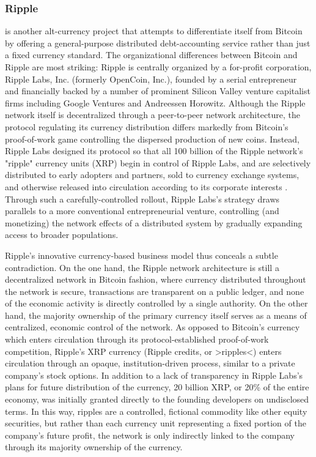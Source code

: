 \subsubsection*{Ripple}
 is another alt-currency project that attempts to differentiate itself from Bitcoin by offering a general-purpose distributed debt-accounting service rather than just a fixed currency standard. The organizational differences between Bitcoin and Ripple are most striking: Ripple is centrally organized by a for-profit corporation, Ripple Labs, Inc. (formerly OpenCoin, Inc.), founded by a serial entrepreneur and financially backed by a number of prominent Silicon Valley venture capitalist firms including Google Ventures and Andreessen Horowitz. Although the Ripple network itself is decentralized through a peer-to-peer network architecture, the protocol regulating its currency distribution differs markedly from Bitcoin's proof-of-work game controlling the dispersed production of new coins. Instead, Ripple Labs designed its protocol so that all 100 billion of the Ripple network's "ripple" currency units (XRP) begin in control of Ripple Labs, and are selectively distributed to early adopters and partners, sold to currency exchange systems, and otherwise released into circulation according to its corporate interests \autocite*{RippleDistribution}. Through such a carefully-controlled rollout, Ripple Labs's strategy draws parallels to a more conventional entrepreneurial venture, controlling (and monetizing) the network effects of a distributed system by gradually expanding access to broader populations.

Ripple's innovative currency-based business model thus conceals a subtle contradiction. On the one hand, the Ripple network architecture is still a decentralized network in Bitcoin fashion, where currency distributed throughout the network is secure, transactions are transparent on a public ledger, and none of the economic activity is directly controlled by a single authority. On the other hand, the majority ownership of the primary currency itself serves as a means of centralized, economic control of the network. As opposed to Bitcoin's currency which enters circulation through its protocol-established proof-of-work competition, Ripple's XRP currency (Ripple credits, or >ripples<) enters circulation through an opaque, institution-driven process, similar to a private company's stock options. In addition to a lack of transparency in Ripple Labs's plans for future distribution of the currency, 20 billion XRP, or 20\% of the entire economy, was initially granted directly to the founding developers on undisclosed terms. In this way, ripples are a controlled, fictional commodity like other equity securities, but rather than each currency unit representing a fixed portion of the company's future profit, the network is only indirectly linked to the company through its majority ownership of the currency.


